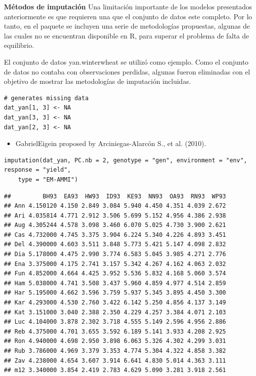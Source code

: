 \textbf{Métodos de imputación}
Una limitación importante de los modelos presentados anteriormente es que requieren una que el conjunto de datos este completo. Por lo tanto, en el paquete se incluyen una serie de metodologías propuestas, algunas de las cuales no se encuentran disponible en R, para superar el problema de falta de equilibrio. 

El conjunto de datos yan.winterwheat se utilizó como ejemplo. Como el conjunto de datos no contaba con observaciones perdidas, algunas fueron eliminadas con el objetivo de mostrar las metodologías de imputación incluidas.

\begin{lstlisting}
# generates missing data
dat_yan[1, 3] <- NA
dat_yan[3, 3] <- NA
dat_yan[2, 3] <- NA
\end{lstlisting}


\begin{itemize}
\item GabrielEigein proposed by Arciniegas-Alarcón S., et al. (2010).
\end{itemize}
\begin{lstlisting}
imputation(dat_yan, PC.nb = 2, genotype = "gen", environment = "env", response = "yield", 
    type = "EM-AMMI")
\end{lstlisting}

\begin{verbatim}
##         BH93  EA93  HW93  ID93  KE93  NN93  OA93  RN93  WP93
## Ann 4.150120 4.150 2.849 3.084 5.940 4.450 4.351 4.039 2.672
## Ari 4.035814 4.771 2.912 3.506 5.699 5.152 4.956 4.386 2.938
## Aug 4.305244 4.578 3.098 3.460 6.070 5.025 4.730 3.900 2.621
## Cas 4.732000 4.745 3.375 3.904 6.224 5.340 4.226 4.893 3.451
## Del 4.390000 4.603 3.511 3.848 5.773 5.421 5.147 4.098 2.832
## Dia 5.178000 4.475 2.990 3.774 6.583 5.045 3.985 4.271 2.776
## Ena 3.375000 4.175 2.741 3.157 5.342 4.267 4.162 4.063 2.032
## Fun 4.852000 4.664 4.425 3.952 5.536 5.832 4.168 5.060 3.574
## Ham 5.038000 4.741 3.508 3.437 5.960 4.859 4.977 4.514 2.859
## Har 5.195000 4.662 3.596 3.759 5.937 5.345 3.895 4.450 3.300
## Kar 4.293000 4.530 2.760 3.422 6.142 5.250 4.856 4.137 3.149
## Kat 3.151000 3.040 2.388 2.350 4.229 4.257 3.384 4.071 2.103
## Luc 4.104000 3.878 2.302 3.718 4.555 5.149 2.596 4.956 2.886
## Reb 4.375000 4.701 3.655 3.592 6.189 5.141 3.933 4.208 2.925
## Ron 4.940000 4.698 2.950 3.898 6.063 5.326 4.302 4.299 3.031
## Rub 3.786000 4.969 3.379 3.353 4.774 5.304 4.322 4.858 3.382
## Zav 4.238000 4.654 3.607 3.914 6.641 4.830 5.014 4.363 3.111
## m12 3.340000 3.854 2.419 2.783 4.629 5.090 3.281 3.918 2.561
\end{verbatim}


